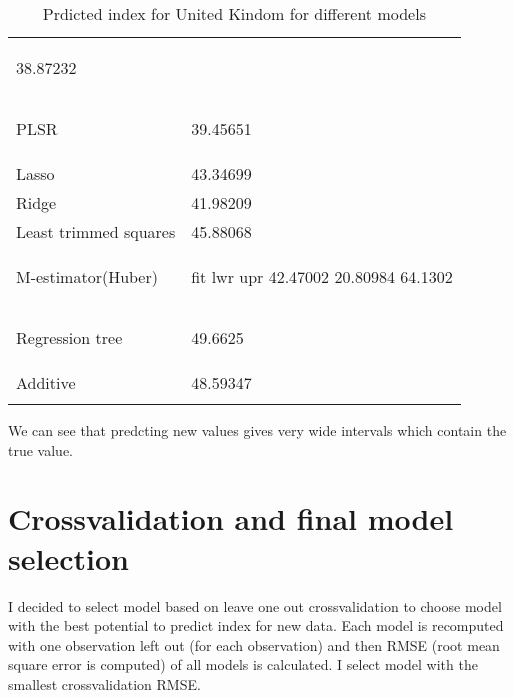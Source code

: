 \documentclass[a4paper]{article}
\begin{document}
\begin{longtable}{ l | p{10cm} }
\begin{Schunk}
\begin{Soutput}
38.87232
\end{Soutput}
\end{Schunk}
\\
PLSR&
\begin{Schunk}
\begin{Soutput}
39.45651
\end{Soutput}
\end{Schunk}
\\
Lasso &
43.34699\\
Ridge &
41.98209\\
Least trimmed squares &
45.88068\\
M-estimator(Huber) &
\begin{Schunk}
\begin{Soutput}
      fit      lwr     upr
 42.47002 20.80984 64.1302
\end{Soutput}
\end{Schunk}
\\
Regression tree &
\begin{Schunk}
\begin{Soutput}
49.6625
\end{Soutput}
\end{Schunk}

\\
Additive &
48.59347\\
\caption{Prdicted index for United Kindom for different models}
\end{longtable}

We can see that predcting new values gives very wide intervals which contain the
true value.

\section{Crossvalidation and final model selection}\label{sec:cross} 
I decided to select model based on leave one out crossvalidation to choose
model with the best potential to predict index for new data. 
Each model is recomputed with one observation left out (for each observation)
and then RMSE (root mean square error is computed) of all models is calculated.
I select model with the smallest crossvalidation RMSE.
\end{document}
